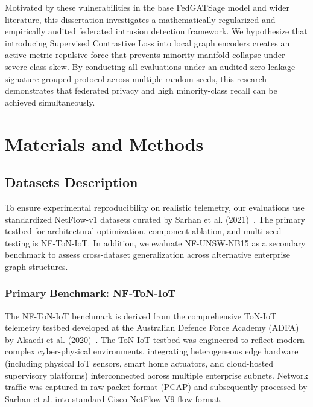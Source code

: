 \documentclass[12pt,a4paper]{report}
\begin{document}
Motivated by these vulnerabilities in the base FedGATSage model and wider literature, this dissertation investigates a mathematically regularized and empirically audited federated intrusion detection framework. We hypothesize that introducing Supervised Contrastive Loss into local graph encoders creates an active metric repulsive force that prevents minority-manifold collapse under severe class skew. By conducting all evaluations under an audited zero-leakage signature-grouped protocol across multiple random seeds, this research demonstrates that federated privacy and high minority-class recall can be achieved simultaneously.


\chapter{Materials and Methods}\label{ch:materials}
\label{chap:materials_methods}

\section{Datasets Description}\label{sec:datasets}

To ensure experimental reproducibility on realistic telemetry, our evaluations use standardized NetFlow-v1 datasets curated by Sarhan et al. (2021)~\cite{sarhan2021netflow}. The primary testbed for architectural optimization, component ablation, and multi-seed testing is NF-ToN-IoT. In addition, we evaluate NF-UNSW-NB15 as a secondary benchmark to assess cross-dataset generalization across alternative enterprise graph structures.

\subsection{Primary Benchmark: NF-ToN-IoT}
The NF-ToN-IoT benchmark is derived from the comprehensive ToN-IoT telemetry testbed developed at the Australian Defence Force Academy (ADFA) by Alsaedi et al. (2020)~\cite{alsaedi2020toniot}. The ToN-IoT testbed was engineered to reflect modern complex cyber-physical environments, integrating heterogeneous edge hardware (including physical IoT sensors, smart home actuators, and cloud-hosted supervisory platforms) interconnected across multiple enterprise subnets. Network traffic was captured in raw packet format (PCAP) and subsequently processed by Sarhan et al. into standard Cisco NetFlow V9 flow format.
\end{document}
